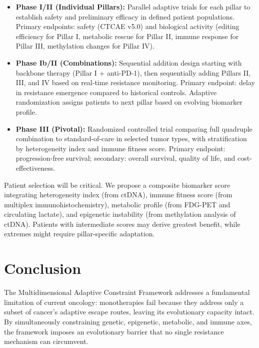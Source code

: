 \documentclass[12pt,a4paper]{article}
\begin{document}
\begin{itemize}
    \item \textbf{Phase I/II (Individual Pillars):} Parallel adaptive trials for each pillar to establish safety and preliminary efficacy in defined patient populations. Primary endpoints: safety (CTCAE v5.0) and biological activity (editing efficiency for Pillar I, metabolic rescue for Pillar II, immune response for Pillar III, methylation changes for Pillar IV).
    
    \item \textbf{Phase Ib/II (Combinations):} Sequential addition design starting with backbone therapy (Pillar I + anti-PD-1), then sequentially adding Pillars II, III, and IV based on real-time resistance monitoring. Primary endpoint: delay in resistance emergence compared to historical controls. Adaptive randomization assigns patients to next pillar based on evolving biomarker profile.
    
    \item \textbf{Phase III (Pivotal):} Randomized controlled trial comparing full quadruple combination to standard-of-care in selected tumor types, with stratification by heterogeneity index and immune fitness score. Primary endpoint: progression-free survival; secondary: overall survival, quality of life, and cost-effectiveness.
\end{itemize}

Patient selection will be critical. We propose a composite biomarker score integrating heterogeneity index (from ctDNA), immune fitness score (from multiplex immunohistochemistry), metabolic profile (from FDG-PET and circulating lactate), and epigenetic instability (from methylation analysis of ctDNA). Patients with intermediate scores may derive greatest benefit, while extremes might require pillar-specific adaptation.

\section{Conclusion}

The Multidimensional Adaptive Constraint Framework addresses a fundamental limitation of current oncology: monotherapies fail because they address only a subset of cancer's adaptive escape routes, leaving its evolutionary capacity intact. By simultaneously constraining genetic, epigenetic, metabolic, and immune axes, the framework imposes an evolutionary barrier that no single resistance mechanism can circumvent.
\end{document}
